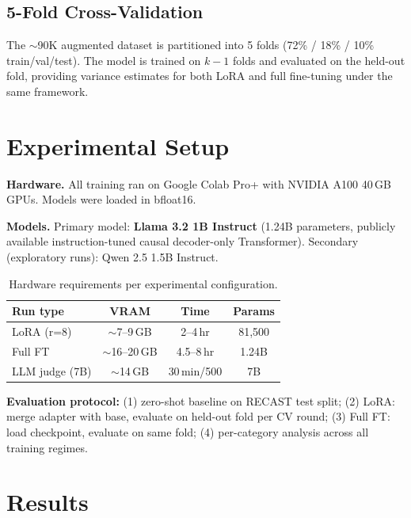 \documentclass[10pt]{article}
\begin{document}
\subsection{5-Fold Cross-Validation}
The $\sim$90K augmented dataset is partitioned into 5 folds
(72\% / 18\% / 10\% train/val/test). The model is trained on $k{-}1$
folds and evaluated on the held-out fold, providing variance estimates
for both LoRA and full fine-tuning under the same framework.

\section{Experimental Setup}

\textbf{Hardware.} All training ran on Google Colab Pro+ with NVIDIA A100
40\,GB GPUs. Models were loaded in bfloat16.

\textbf{Models.} Primary model: \textbf{Llama 3.2 1B Instruct} (1.24B
parameters, publicly available instruction-tuned causal decoder-only
Transformer). Secondary (exploratory runs): Qwen 2.5 1.5B Instruct.

\begin{table}[H]
\centering
\caption{Hardware requirements per experimental configuration.}
\label{tab:compute}
\small
\begin{tabular}{lccc}
\toprule
\textbf{Run type} & \textbf{VRAM} & \textbf{Time} & \textbf{Params} \\
\midrule
LoRA (r=8)   & $\sim$7--9\,GB   & 2--4\,hr    & 81,500 \\
Full FT       & $\sim$16--20\,GB & 4.5--8\,hr  & 1.24B  \\
LLM judge (7B)& $\sim$14\,GB    & 30\,min/500 & 7B     \\
\bottomrule
\end{tabular}
\end{table}

\textbf{Evaluation protocol:} (1) zero-shot baseline on RECAST test split;
(2) LoRA: merge adapter with base, evaluate on held-out fold per CV round;
(3) Full FT: load checkpoint, evaluate on same fold; (4) per-category
analysis across all training regimes.

\section{Results}
\end{document}

